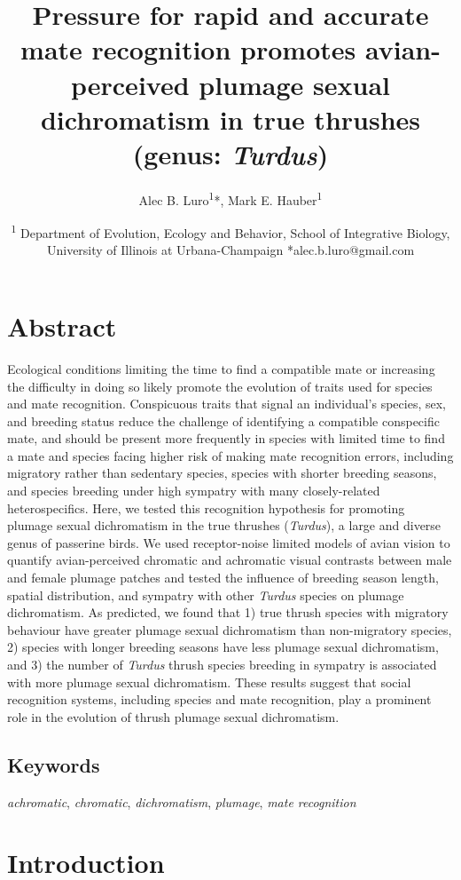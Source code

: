 \documentclass[
  a4paper,
]{article}
\title{Pressure for rapid and accurate mate recognition promotes
avian-perceived plumage sexual dichromatism in true thrushes (genus:
\emph{Turdus})}
\author{Alec B. Luro\textsuperscript{1}*, Mark E.
Hauber\textsuperscript{1}}
\date{\textsuperscript{1} Department of Evolution, Ecology and Behavior,
School of Integrative Biology, University of Illinois at
Urbana-Champaign *alec.b.luro@gmail.com}
\begin{document}
\maketitle

\hypertarget{abstract}{%
\section{Abstract}\label{abstract}}

Ecological conditions limiting the time to find a compatible mate or
increasing the difficulty in doing so likely promote the evolution of
traits used for species and mate recognition. Conspicuous traits that
signal an individual's species, sex, and breeding status reduce the
challenge of identifying a compatible conspecific mate, and should be
present more frequently in species with limited time to find a mate and
species facing higher risk of making mate recognition errors, including
migratory rather than sedentary species, species with shorter breeding
seasons, and species breeding under high sympatry with many
closely-related heterospecifics. Here, we tested this recognition
hypothesis for promoting plumage sexual dichromatism in the true
thrushes (\emph{Turdus}), a large and diverse genus of passerine birds.
We used receptor-noise limited models of avian vision to quantify
avian-perceived chromatic and achromatic visual contrasts between male
and female plumage patches and tested the influence of breeding season
length, spatial distribution, and sympatry with other \emph{Turdus}
species on plumage dichromatism. As predicted, we found that 1) true
thrush species with migratory behaviour have greater plumage sexual
dichromatism than non-migratory species, 2) species with longer breeding
seasons have less plumage sexual dichromatism, and 3) the number of
\emph{Turdus} thrush species breeding in sympatry is associated with
more plumage sexual dichromatism. These results suggest that social
recognition systems, including species and mate recognition, play a
prominent role in the evolution of thrush plumage sexual dichromatism.

\hypertarget{keywords}{%
\subsection{Keywords}\label{keywords}}

\emph{achromatic}, \emph{chromatic}, \emph{dichromatism},
\emph{plumage}, \emph{mate recognition}

\hypertarget{introduction}{%
\section{Introduction}\label{introduction}}
\end{document}

